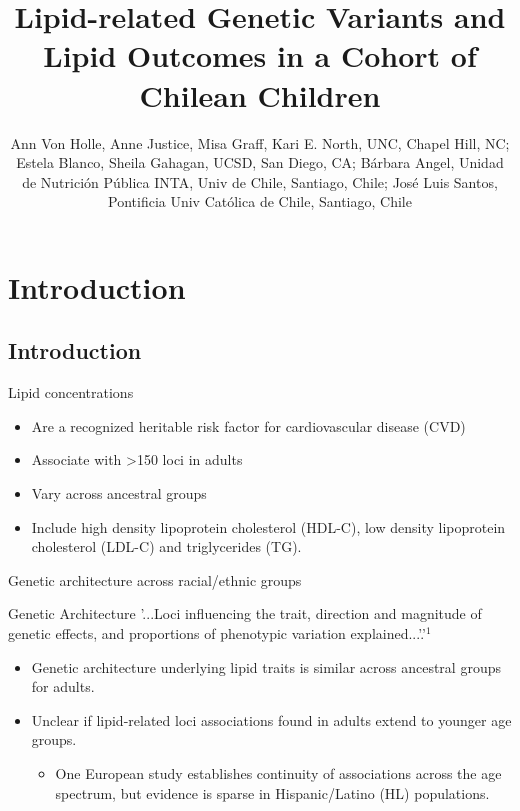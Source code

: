 \documentclass[pdf]{beamer}\usepackage[]{graphicx}\usepackage[]{color}
\title{Lipid-related Genetic Variants and Lipid Outcomes in a Cohort of Chilean Children}
\author[vonholle@unc.edu]{Ann Von Holle, Anne Justice, Misa Graff, Kari E. North, UNC, Chapel Hill, NC; Estela Blanco, Sheila Gahagan, UCSD, San Diego, CA; B\'arbara Angel, Unidad de Nutrici\'on P\'ublica INTA, Univ de Chile, Santiago, Chile; Jos\'e Luis Santos, Pontificia Univ Cat\'olica de Chile, Santiago, Chile}
\begin{document}
\begin{frame}
\titlepage
\centering
\end{frame}

\section{Introduction}
\subsection{Introduction}

\begin{frame}{Lipid concentrations}
\large  
                \begin{itemize} 
                    \item Are a recognized heritable risk factor for cardiovascular disease (CVD)
                    \item Associate with >150 loci in adults
                    \item Vary across ancestral groups
                    \item Include high density lipoprotein cholesterol (HDL-C), low density lipoprotein cholesterol (LDL-C) and triglycerides (TG).
                    \end{itemize}
    
\end{frame}


\begin{frame}{Genetic architecture across racial/ethnic groups}

\begin{block}{Genetic Architecture}
'...Loci influencing the trait, direction and magnitude of genetic effects, and proportions of phenotypic variation explained...'.'$^1$
\end{block}

  \begin{itemize}
      \item Genetic architecture underlying lipid traits is similar across ancestral groups for adults.
      \item Unclear if lipid-related loci associations found in adults extend to younger age groups.
      
      \begin{itemize}
        \item One European study establishes continuity of associations across the age spectrum, but evidence is sparse in Hispanic/Latino (HL) populations.
        \end{itemize}
      \end{itemize}
    
\end{frame}
\end{document}
